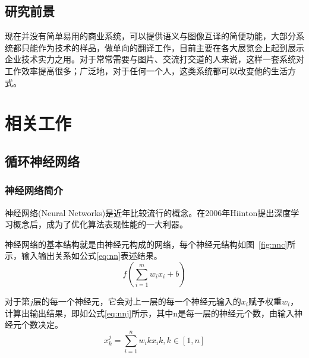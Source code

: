 \subsection{研究前景}
现在并没有简单易用的商业系统，可以提供语义与图像互译的简便功能，大部分系统都只能作为技术的样品，做单向的翻译工作，目前主要在各大展览会上起到展示企业技术实力之用。对于常常需要与图片、交流打交道的人来说，这样一套系统对工作效率提高很多；广泛地，对于任何一个人，这类系统都可以改变他的生活方式。

\section{相关工作}

\subsection{循环神经网络}
\subsubsection{神经网络简介}
神经网络(Neural Networks)是近年比较流行的概念。在2006年Hiinton提出深度学习概念后，成为了优化算法表现性能的一大利器。

神经网络的基本结构就是由神经元构成的网络，每个神经元结构如图~\ref{fig:nnc}所示，输入输出关系如公式\eqref{eq:nn}表述结果。
\begin{equation}
    \label{eq:nn}
    f( \sum\limits_{i=1}^{m} w_i x_i + b ) 
\end{equation}

对于第$j$层的每一个神经元，它会对上一层的每一个神经元输入的$x_i$赋予权重$w_i$，计算出输出结果，即如公式\eqref{eq:nnj}所示，其中n是每一层的神经元个数，由输入神经元个数决定。
\begin{equation}
    \label{eq:nnj}
    x_k^j = \sum\limits_{i=1}^{n} w_ik x_ik, k\in \left[1,n\right]
\end{equation}

